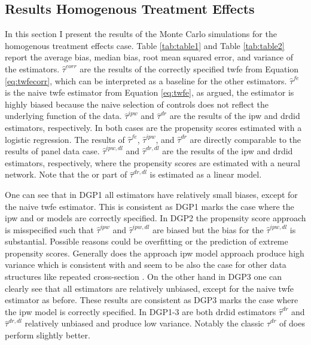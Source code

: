 \subsection{Results Homogenous Treatment Effects}



In this section I present the results of the Monte Carlo simulations for the homogenous treatment effects case.
Table \ref{tab:table1} and Table \ref{tab:table2} report the average bias, median bias, root mean squared error, and variance of the estimators.
$\hat{\tau}^{corr}$ are the results of the correctly specified \ac{twfe} from Equation \ref{eq:twfecorr}, which can be interpreted as a baseline for the other estimators.
$\hat{\tau}^{fe}$ is the naive \ac{twfe} estimator from Equation \ref{eq:twfe}, as argued, the estimator is highly biased because the naive selection of controls does not reflect the underlying function of the data.
$\hat{\tau}^{ipw}$ and $\hat{\tau}^{dr}$ are the results of the \ac{ipw} and \ac{drdid} estimators, respectively.
In both cases are the propensity scores estimated with a logistic regression.
The results of $\hat{\tau}^{fe}$, $\hat{\tau}^{ipw}$, and $\hat{\tau}^{dr}$ are directly comparable to the results of \citet{santannaDoublyRobustDifferenceindifferences2020} panel data case.
$\hat{\tau}^{ipw,dl}$ and $\hat{\tau}^{dr,dl}$ are the results of the \ac{ipw} and \ac{drdid} estimators, respectively, where the propensity scores are estimated with a neural network.
Note that the \ac{or} part of $\hat{\tau}^{dr,dl}$ is estimated as a linear model.

One can see that in DGP1 all estimators have relatively small biases, except for the naive \ac{twfe} estimator.
This is consistent as DGP1 marks the case where the \ac{ipw} and \ac{or} models are correctly specified.
In DGP2 the propensity score approach is misspecified such that $\hat{\tau}^{ipw}$ and $\hat{\tau}^{ipw,dl}$ are biased but the bias for the  $\hat{\tau}^{ipw,dl}$ is substantial.
Possible reasons could be overfitting or the prediction of extreme propensity scores.
Generally does the approach \ac{ipw} model approach produce high variance which is consistent with \citet{santannaDoublyRobustDifferenceindifferences2020} and seem to be also the case for other data structures like repeated cross-section \citep{santannaDoublyRobustDifferenceindifferences2020,manfeDifferenceInDifferenceDesignRepeated}.
On the other hand in DGP3 one can clearly see that all estimators are relatively unbiased, except for the naive \ac{twfe} estimator as before.
These results are consistent as DGP3 marks the case where the \ac{ipw} model is correctly specified.
In DGP1-3 are both \ac{drdid} estimators $\hat{\tau}^{dr}$ and $\hat{\tau}^{dr,dl}$ relatively unbiased and produce low variance.
Notably the classic $\hat{\tau}^{dr}$ of \citet{santannaDoublyRobustDifferenceindifferences2020} does perform slightly better.

